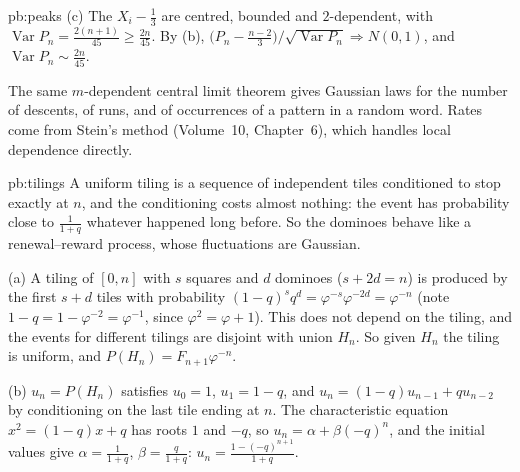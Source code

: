 \begin{solution}{pb:peaks}
(c) The $X_i-\frac13$ are centred, bounded and $2$-dependent, with $\operatorname{Var}P_n=\frac{2(n+1)}{45}\ge\frac{2n}{45}$. By (b), $\bigl(P_n-\frac{n-2}3\bigr)/\sqrt{\operatorname{Var}P_n}\Rightarrow N(0,1)$,
and $\operatorname{Var}P_n\sim\frac{2n}{45}$.

\leads The same $m$-dependent central limit theorem gives Gaussian laws for the number of descents, of runs, and of occurrences of a pattern in a random word. Rates come from Stein's method (Volume~10, Chapter~6), which handles local dependence directly.
\end{solution}

\begin{solution}{pb:tilings}
\idea A uniform tiling is a sequence of independent tiles conditioned to stop exactly at $n$, and the conditioning costs almost nothing: the event has probability
close to $\frac1{1+q}$ whatever happened long before. So the dominoes behave like a renewal--reward process, whose fluctuations are Gaussian.

\writeup (a) A tiling of $[0,n]$ with $s$ squares and $d$ dominoes ($s+2d=n$) is produced by the first $s+d$ tiles with probability
$(1-q)^sq^d=\varphi^{-s}\varphi^{-2d}=\varphi^{-n}$ (note $1-q=1-\varphi^{-2}=\varphi^{-1}$, since $\varphi^2=\varphi+1$). This does not depend on the tiling, and the
events for different tilings are disjoint with union $H_n$. So given $H_n$ the tiling is uniform, and $P(H_n)=F_{n+1}\varphi^{-n}$.

(b) $u_n=P(H_n)$ satisfies $u_0=1$, $u_1=1-q$, and $u_n=(1-q)u_{n-1}+qu_{n-2}$ by conditioning on the last tile ending at $n$. The characteristic equation
$x^2=(1-q)x+q$ has roots $1$ and $-q$, so $u_n=\alpha+\beta(-q)^n$, and the initial values give $\alpha=\frac1{1+q}$, $\beta=\frac q{1+q}$: $u_n=\frac{1-(-q)^{n+1}}{1+q}$.


\end{solution}
